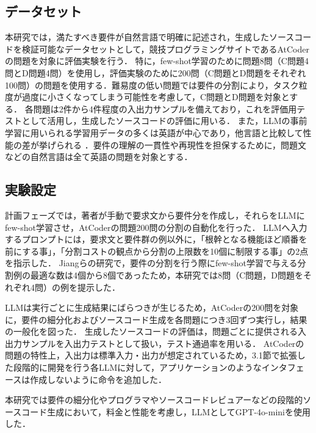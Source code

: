\documentclass[submit,techrep,noauthor]{ipsj}
\begin{document}
\subsection{データセット}
本研究では，満たすべき要件が自然言語で明確に記述され，生成したソースコードを検証可能なデータセットとして，競技プログラミングサイトであるAtCoderの問題を対象に評価実験を行う．
特に，few-shot学習のために問題8問（C問題4問とD問題4問）を使用し，評価実験のために200問（C問題とD問題をそれぞれ100問）の問題を使用する．難易度の低い問題では要件の分割により，タスク粒度が過度に小さくなってしまう可能性を考慮して，C問題とD問題を対象とする．
各問題は2件から4件程度の入出力サンプルを備えており，これを評価用テストとして活用し，生成したソースコードの評価に用いる．
また，LLMの事前学習に用いられる学習用データの多くは英語が中心であり，他言語と比較して性能の差が挙げられる\cite{LLM_En} ．要件の理解の一貫性や再現性を担保するために，問題文などの自然言語は全て英語の問題を対象とする．

\subsection{実験設定}
計画フェーズでは，著者が手動で要求文から要件分を作成し，それらをLLMにfew-shot学習させ，AtCoderの問題200問の分割の自動化を行った．
LLMへ入力するプロンプトには，要求文と要件群の例以外に，「根幹となる機能ほど順番を前にする事」，「分割コストの観点から分割の上限数を10個に制限する事」の2点を指示した．
Jiangらの研究\cite{tosem}で，要件の分割を行う際にfew-shot学習で与える分割例の最適な数は4個から8個であったため，本研究では8問（C問題，D問題をそれぞれ4問）の例を提示した．

LLMは実行ごとに生成結果にばらつきが生じるため，AtCoderの200問を対象に，要件の細分化およびソースコード生成を各問題につき3回ずつ実行し，結果の一般化を図った．
生成したソースコードの評価は，問題ごとに提供される入出力サンプルを入出力テストとして扱い，テスト通過率を用いる．
AtCoderの問題の特性上，入出力は標準入力・出力が想定されているため，3.1節で拡張した段階的に開発を行う各LLMに対して，アプリケーションのようなインタフェースは作成しないように命令を追加した．

本研究では要件の細分化やプログラマやソースコードレビュアーなどの段階的ソースコード生成において，料金と性能を考慮し，LLMとしてGPT-4o-mini\cite{openai_gpt_4o_mini}を使用した．
\end{document}
